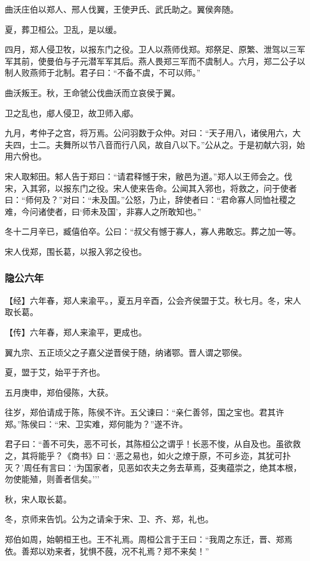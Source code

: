 \documentclass[]{article}
\begin{document}
曲沃庄伯以郑人、邢人伐翼，王使尹氏、武氏助之。翼侯奔随。

夏，葬卫桓公。卫乱，是以缓。

四月，郑人侵卫牧，以报东门之役。卫人以燕师伐郑。郑祭足、原繁、泄驾以三军军其前，使曼伯与子元潜军军其后。燕人畏郑三军而不虞制人。六月，郑二公子以制人败燕师于北制。君子曰：``不备不虞，不可以师。''

曲沃叛王。秋，王命虢公伐曲沃而立哀侯于翼。

卫之乱也，郕人侵卫，故卫师入郕。

九月，考仲子之宫，将万焉。公问羽数于众仲。对曰：``天子用八，诸侯用六，大夫四，士二。夫舞所以节八音而行八风，故自八以下。''公从之。于是初献六羽，始用六佾也。

宋人取邾田。邾人告于郑曰：``请君释憾于宋，敝邑为道。''郑人以王师会之。伐宋，入其郛，以报东门之役。宋人使来告命。公闻其入郛也，将救之，问于使者曰：``师何及？''对曰：``未及国。''公怒，乃止，辞使者曰：``君命寡人同恤社稷之难，今问诸使者，曰`师未及国'，非寡人之所敢知也。''

冬十二月辛已，臧僖伯卒。公曰：``叔父有憾于寡人，寡人弗敢忘。葬之加一等。

宋人伐郑，围长葛，以报入郛之役也。

\hypertarget{header-n78}{%
\subsubsection{隐公六年}\label{header-n78}}

【经】六年春，郑人来渝平。，夏五月辛酉，公会齐侯盟于艾。秋七月。冬，宋人取长葛。

【传】六年春，郑人来渝平，更成也。

翼九宗、五正顷父之子嘉父逆晋侯于随，纳诸鄂。晋人谓之鄂侯。

夏，盟于艾，始平于齐也。

五月庚申，郑伯侵陈，大获。

往岁，郑伯请成于陈，陈侯不许。五父谏曰：``亲仁善邻，国之宝也。君其许郑。''陈侯曰：``宋、卫实难，郑何能为？''遂不许。

君子曰：``善不可失，恶不可长，其陈桓公之谓乎！长恶不悛，从自及也。虽欲救之，其将能乎？《商书》曰：`恶之易也，如火之燎于原，不可乡迩，其犹可扑灭？'周任有言曰：`为国家者，见恶如农夫之务去草焉，芟夷蕴崇之，绝其本根，勿使能殖，则善者信矣。'''

秋，宋人取长葛。

冬，京师来告饥。公为之请籴于宋、卫、齐、郑，礼也。

郑伯如周，始朝桓王也。王不礼焉。周桓公言于王曰：``我周之东迁，晋、郑焉依。善郑以劝来者，犹惧不蔇，况不礼焉？郑不来矣！''
\end{document}
